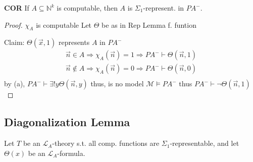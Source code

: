 \documentclass[12pt]{article}
\newcommand{\Nat}{\ensuremath{\mathbb{N}}}
\newcommand{\proves}{\vdash}
\begin{document}
\textbf{COR} If $A \subseteq \Nat^k$ is computable, then $A$ is $\Sigma_1$-represent. in $PA^-$.

\begin{proof}
  $\chi_A$ is computable
  Let $\Theta$ be as in Rep Lemma f. funtion

Claim: $\Theta(\vec{x},1)$ represents $A$ in $PA^-$
\begin{align*}
  \vec{n} \in A \Rightarrow \chi_A(\vec{n}) = 1 \Rightarrow PA^- \proves \Theta(\vec{n}, 1) \\
  \vec{n} \not\in A \Rightarrow \chi_A(\vec{n}) = 0 \Rightarrow PA^- \proves \Theta(\vec{n}, 0) \\
\end{align*}
by (a), $PA^- \proves \exists !y \Theta(\vec{n},y)$
thus, is no model $\mathcal{M} \models PA^-$
thus $PA^- \proves \neg \Theta(\vec{n},1)$
\end{proof}

\subsection*{Diagonalization Lemma}

Let $T$ be an $\mathcal{L}_A$-theory s.t. all comp. functions are
$\Sigma_1$-representable, and let $\Theta(x)$ be an $\mathcal{L}_A$-formula.
\end{document}
